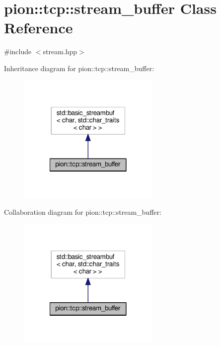 \hypertarget{classpion_1_1tcp_1_1stream__buffer}{\section{pion\-:\-:tcp\-:\-:stream\-\_\-buffer Class Reference}
\label{classpion_1_1tcp_1_1stream__buffer}
}


{\ttfamily \#include $<$stream.\-hpp$>$}



Inheritance diagram for pion\-:\-:tcp\-:\-:stream\-\_\-buffer\-:
\nopagebreak
\begin{figure}[H]
\begin{center}
\leavevmode
\includegraphics[width=194pt]{classpion_1_1tcp_1_1stream__buffer__inherit__graph}
\end{center}
\end{figure}


Collaboration diagram for pion\-:\-:tcp\-:\-:stream\-\_\-buffer\-:
\nopagebreak
\begin{figure}[H]
\begin{center}
\leavevmode
\includegraphics[width=194pt]{classpion_1_1tcp_1_1stream__buffer__coll__graph}
\end{center}
\end{figure}
